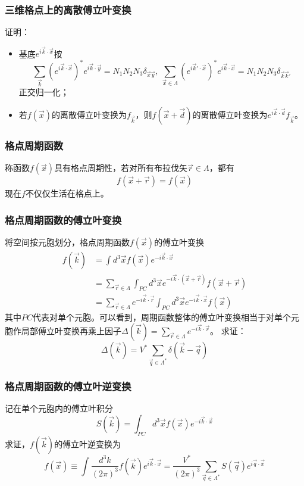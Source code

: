 \documentclass[CJK]{beamer}
\begin{document}
\begin{frame}
\frametitle{\bch 三维格点上的离散傅立叶变换 \ech}
\bch
证明：
\begin{itemize}
\item 基底$e^{i\vec k \cdot \vec x}$按
$$
\sum_{\vec{k}} (e^{i\vec k \cdot \vec x})^* e^{i\vec k \cdot \vec y} ={N_1 N_2 N_3}  \delta_{\vec x \vec y},\ \sum_{\vec x \in \Lambda} (e^{i\vec{k}'\cdot \vec x})^* e^{i \vec k \cdot \vec x} = {N_1 N_2 N_3} \delta_{\vec k \vec{k}'}
$$
正交归一化；
\item 若$f(\vec x)$的离散傅立叶变换为$f_{\vec k}$，则$f(\vec x + \vec d)$的离散傅立叶变换为$e^{i\vec k \cdot \vec d} f_{\vec k}$。 
\end{itemize}
\ech
\end{frame}

\begin{frame}
\frametitle{\bch 格点周期函数 \ech}
\bch
称函数$f(\vec x)$具有格点周期性，若对所有布拉伐矢$\vec r \in \Lambda$，都有
$$
f(\vec x + \vec r) = f(\vec x)
$$
现在$f$不仅仅生活在格点上。

\ech
\end{frame}


\begin{frame}
\frametitle{\bch 格点周期函数的傅立叶变换 \ech}
\bch
将空间按元胞划分，格点周期函数$f(\vec x)$的傅立叶变换
$$
\begin{aligned}
f(\vec k) &= \int d^3 \vec x f(\vec x) e^{-i\vec k \cdot \vec x} \\
&= \sum_{\vec r \in \Lambda} \int_{PC} d^3 \vec x e^{-i\vec k \cdot (\vec x + \vec r)} f(\vec x + \vec r) \\
&= \sum_{\vec r \in \Lambda} e^{-i\vec k \cdot \vec r} \int_{PC} d^3 \vec x e^{-i\vec k \cdot \vec x} f(\vec x)
\end{aligned}
$$
其中$PC$代表对单个元胞。可以看到，周期函数整体的傅立叶变换相当于对单个元胞作局部傅立叶变换再乘上因子$\varDelta (\vec k) = \sum_{\vec r \in \Lambda} e^{-i\vec k \cdot \vec r}
$。
求证：$$\varDelta(\vec k) = V^* \sum_{\vec q \in \Lambda^*} \delta(\vec k - \vec q)$$
\ech
\end{frame}

\begin{frame}
\frametitle{\bch 格点周期函数的傅立叶逆变换 \ech}
\bch
记在单个元胞内的傅立叶积分
$$
S(\vec k ) = \int_{PC} d^3 \vec x f(\vec x) e^{-i \vec k \cdot \vec x}
$$
求证，$f(\vec k)$的傅立叶逆变换为
$$
f(\vec x) \equiv \int \frac{d^3 k}{(2\pi)^3} f(\vec k) e^{i\vec k \cdot \vec x} = \frac{V^*}{(2\pi)^3} \sum_{\vec q \in \Lambda^*} S(\vec q)e^{i\vec q \cdot \vec x}
$$
\ech
\end{frame}
\end{document}
